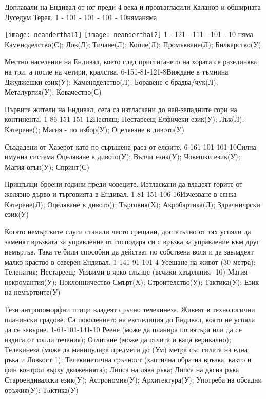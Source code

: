 \begin{multicols}{2}
{Доплавали на Ендивал от юг преди 4 века и провъзгласили Каланор и обширната Луседум Терея.}
{1 - 10}{1 - 10}{1 - 10}{1 - 10}{няма}{няма}

\texttt{[image: neanderthal1]}
\texttt{[image: neanderthal2]}
{}
{1 - 12}{1 - 11}{1 - 10}{1 - 10}
{няма}
{
Каменоделство(С);
Лов(Л);
Тичане(Л);
Копие(Л);
Промъкване(Л);
Билкарство(У)
}

{Местно население на Ендивал, което след пристигането на хората се разединява на три, а после на четири, кралства.}
{6-15}{1-8}{1-12}{1-8}{Виждане в тъмнина}
{
Джуджешки език(У);
Каменоделство(Л);
Боравене с брадва/чук(Л);
Металургия(У);
Ковачество(С)
}

{Първите жители на Ендивал, сега са изтласкани до най-западните гори на континента.}
{1-8}{6-15}{1-15}{1-12}{Неспящ; Нестареещ}
{
Елфичеки език(У);
Лък(Л);
Катерене();
Магия - по избор(У);
Оцеляване в дивото(У)
}

{Създадени от Хазерот като по-съръшена раса от елфите.}
{6-16}{1-10}{1-10}{1-10}{Силна имунна система}
{
Оцеляване в дивото(У);
Вълчи език(У);
Човешки език(У);
Магия-огън(У);
Спринт(С)
}

{Пришълци броени години преди човеците. Изтласкани да владеят горите от желязно дърво и търговията в Ендивал.}
{1-8}{1-15}{1-10}{6-16}{Изчезване в сянка}
{
Катерене(Л);
Оцеляване в дивото();
Търговия(Х);
Акробартика(Л);
Здрачничрски език(У)
}

{Когато немъртвите слуги станали често срещани, достатъчно от тях успяли да заменят връзката за управление от господаря си с връзка за управление към друг немъртъв.
Така те били способни да действат по собствена воля и да завладеят малко краство в северен Ендивал.}
{1-14}{1-9}{1-10}{1-4}
{
Усещане на живот (30 метра);
Телепатия;
Нестареещ;
Уязвими в ярко слънце (всчики хвърляния -10)
}
{
Магия-некромантия(У);
Поклонничество-Смърт(Х);
Строителство(У);
Тактика(У); %
Език на немъртвите(У)
}

{Тези антропоморфни птици владеят сръчно телекинеза.
Живеят в технологични планински градове.
Са поколението на експедиция до Ендивал, която не успяла да се завърне.}
{1-6}{1-10}{1-14}{1-10}
{
Реене (може да планира по вятъра или да се издига от топли течения);
Отлитане (може да отлита и каца верикално);
Телекинеза (може да манипулира предмети до (Ум) метра със силата на една ръка и Ловкост 1);
Телекинетична сръчност (хаптична обратна връзка, както и фин контрол върху движенията);
Липса на лява ръка;
Липса на дясна ръка
}
{
Староендивалски език(У);
Астрономия(У);
Архитектура(У);
Употреба на обсадни оръжия(У);
Тaктика(У)
}


\end{multicols}
